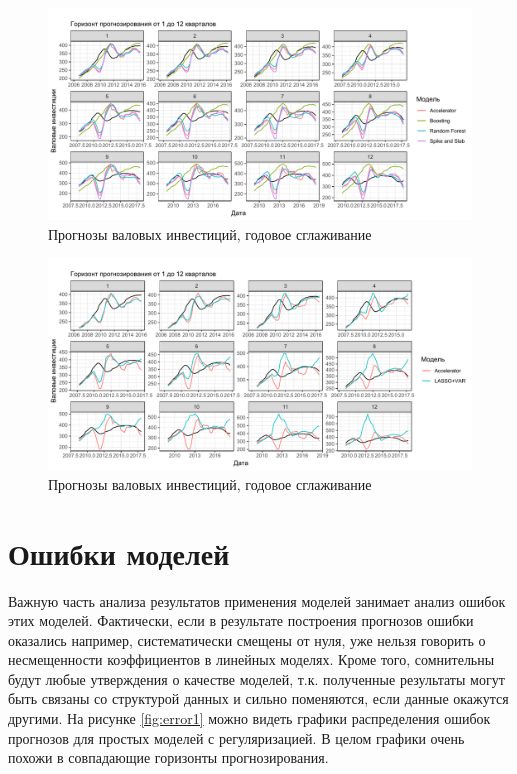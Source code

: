 \begin{figure}[h]
    \centering
    \includegraphics[width = \textwidth]{smooth3.pdf}
    \caption{Прогнозы валовых инвестиций, годовое сглаживание}
    \label{fig:smooth3}
\end{figure}


\begin{figure}[h]
    \centering
    \includegraphics[width = \textwidth]{smooth4.pdf}
    \caption{Прогнозы валовых инвестиций, годовое сглаживание}
    \label{fig:smooth4}
\end{figure}
\section{Ошибки моделей}
Важную часть анализа результатов применения моделей занимает анализ ошибок этих моделей. Фактически, если в результате построения прогнозов ошибки оказались например, систематически смещены от нуля, уже нельзя говорить о несмещенности коэффициентов в линейных моделях. Кроме того, сомнительны будут любые утверждения о качестве моделей, т.к. полученные результаты могут быть связаны со структурой данных и сильно поменяются, если данные окажутся другими. На рисунке \ref{fig:error1} можно видеть графики распределения ошибок прогнозов для простых моделей с регуляризацией. В целом графики очень похожи в совпадающие горизонты прогнозирования.

